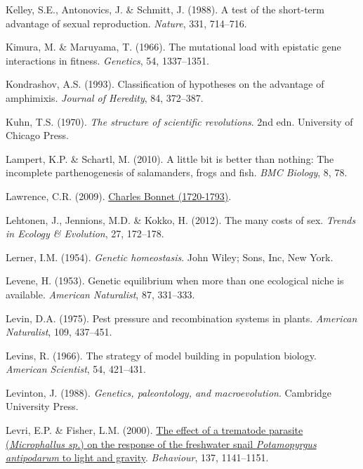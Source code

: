 \documentclass[
  letterpaper,
]{book}
\newlength{\cslhangindent}
\newenvironment{CSLReferences}[2] %
 {\begin{list}{}{%
  \setlength{\itemindent}{0pt}
  \setlength{\leftmargin}{0pt}
  \setlength{\parsep}{0pt}
  \ifodd #1
   \setlength{\leftmargin}{\cslhangindent}
   \setlength{\itemindent}{-1\cslhangindent}
  \fi
  \setlength{\itemsep}{#2\baselineskip}}}
 {\end{list}}
\begin{document}
\begin{CSLReferences}{1}{0}
Kelley, S.E., Antonovics, J. \& Schmitt, J. (1988). A test of the
short-term advantage of sexual reproduction. \emph{Nature}, 331,
714--716.

Kimura, M. \& Maruyama, T. (1966). The mutational load with epistatic
gene interactions in fitness. \emph{Genetics}, 54, 1337--1351.

Kondrashov, A.S. (1993). Classification of hypotheses on the advantage
of amphimixis. \emph{Journal of Heredity}, 84, 372--387.

Kuhn, T.S. (1970). \emph{The structure of scientific revolutions}. 2nd
edn. University of Chicago Press.

Lampert, K.P. \& Schartl, M. (2010). A little bit is better than
nothing: The incomplete parthenogenesis of salamanders, frogs and fish.
\emph{BMC Biology}, 8, 78.

Lawrence, C.R. (2009). \href{https://hdl.handle.net/10776/1745}{{Charles
Bonnet} (1720-1793)}.

Lehtonen, J., Jennions, M.D. \& Kokko, H. (2012). The many costs of sex.
\emph{Trends in Ecology \& Evolution}, 27, 172--178.

Lerner, I.M. (1954). \emph{Genetic homeostasis}. John Wiley; Sons, Inc,
New York.

Levene, H. (1953). Genetic equilibrium when more than one ecological
niche is available. \emph{American Naturalist}, 87, 331--333.

Levin, D.A. (1975). Pest pressure and recombination systems in plants.
\emph{American Naturalist}, 109, 437--451.

Levins, R. (1966). The strategy of model building in population biology.
\emph{American Scientist}, 54, 421--431.

Levinton, J. (1988). \emph{Genetics, paleontology, and macroevolution}.
Cambridge University Press.

Levri, E.P. \& Fisher, L.M. (2000).
\href{https://doi.org/10.1163/156853900502565}{The effect of a trematode
parasite (\emph{{M}icrophallus sp.}) {o}n the response of the freshwater
snail \emph{{P}otamopyrgus antipodarum} to light and gravity}.
\emph{Behaviour}, 137, 1141--1151.


\end{CSLReferences}
\end{document}
